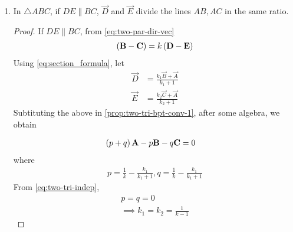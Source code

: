 \begin{enumerate}[label=\thesection.\arabic*.,ref=\thesection.\theenumi]
  \item In $\triangle ABC$, if $DE \parallel BC$, $\vec{D}$ and $\vec{E}$ divide the lines $AB, AC$ in the same ratio.  
	  \label{prop:two-tri-bpt-conv}
	  \begin{proof}
If $DE \parallel BC$,
		  from 
 \eqref{eq:two-par-dir-vec}
  \begin{align}
	  \label{prop:two-tri-bpt-conv-1}
	  \brak{\vec{B}- \vec{C}} = k\brak{\vec{D}-	  \vec{E}}
  \end{align}
Using   
	  \eqref{eq:section_formula}, 
let 
  \begin{align}
	  \vec{D}&= \frac{k_1\vec{B}+ \vec{A}}{k_1+1}
	  \\
	  \vec{E}&= \frac{k_2\vec{C}+ \vec{A}}{k_2+1}
  \end{align}
	  Subtituting the above in 
	  \eqref{prop:two-tri-bpt-conv-1}, after some algebra, we obtain 
	
  \begin{align}
\left(p+q\right)\mathbf{A}- p\mathbf{B} -q\mathbf{C} &= 0
  \end{align}
  where
  \begin{align}
	  p = \frac{1}{k} -  \frac{k_1}{k_1+1},
	  q = \frac{1}{k} -  \frac{k_1}{k_1+1}
  \end{align}
From 	  
	  \eqref{eq:two-tri-indep},
  \begin{align}
	p = q = 0
	  \\
	  \implies k_1 = k_2  = \frac{1}{k-1}
  \end{align}

	  \end{proof}
	  \fi
\end{enumerate}
